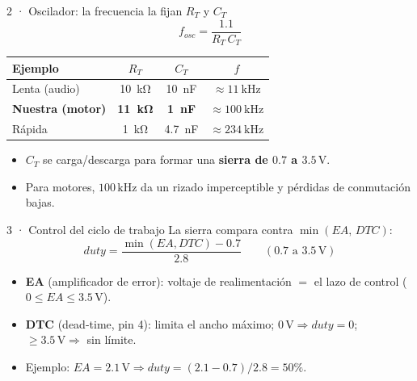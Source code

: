 \documentclass[aspectratio=169]{beamer}
\begin{document}
\begin{frame}{2 · Oscilador: la frecuencia la fijan $R_T$ y $C_T$}
  \[
    f_{osc} = \frac{1.1}{R_T\,C_T}
  \]
  \begin{table}
    \small
    \begin{tabular}{lccc}
      \toprule
      Ejemplo & $R_T$ & $C_T$ & $f$ \\
      \midrule
      Lenta (audio) & \SI{10}{\kilo\ohm} & \SI{10}{\nano\farad} & $\approx \SI{11}{\kilo\hertz}$ \\
      \textbf{Nuestra (motor)} & \textbf{\SI{11}{\kilo\ohm}} & \textbf{\SI{1}{\nano\farad}} & $\approx \SI{100}{\kilo\hertz}$ \\
      Rápida & \SI{1}{\kilo\ohm} & \SI{4.7}{\nano\farad} & $\approx \SI{234}{\kilo\hertz}$ \\
      \bottomrule
    \end{tabular}
  \end{table}
  \begin{itemize}
    \item $C_T$ se carga/descarga para formar una \textbf{sierra de $0.7$ a $3.5\,\mathrm{V}$}.
    \item Para motores, $100\,\mathrm{kHz}$ da un rizado imperceptible y pérdidas de conmutación bajas.
  \end{itemize}
\end{frame}

\begin{frame}{3 · Control del ciclo de trabajo}
  La sierra compara contra $\min(EA, \, DTC)$:
  \[
    duty = \frac{\min(EA, DTC) - 0.7}{2.8}
    \qquad (0.7\text{ a } 3.5\,\mathrm{V})
  \]
  \begin{itemize}
    \item \textbf{EA} (amplificador de error): voltaje de realimentación
      $=$ el lazo de control ($0 \le EA \le 3.5\,\mathrm{V}$).
    \item \textbf{DTC} (dead-time, pin 4): limita el ancho máximo; $0\,\mathrm{V}
      \Rightarrow duty=0$; $\ge 3.5\,\mathrm{V} \Rightarrow$ sin límite.
    \item Ejemplo: $EA = 2.1\,\mathrm{V} \Rightarrow duty = (2.1-0.7)/2.8 = 50\%$.
  \end{itemize}
\end{frame}
\end{document}
